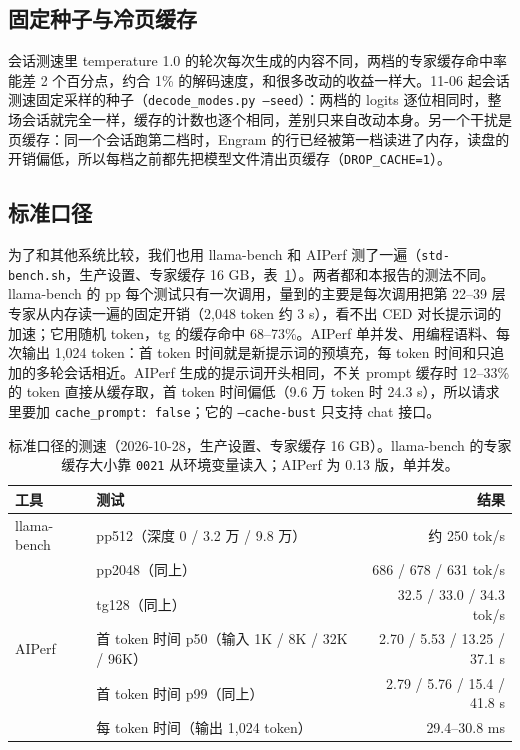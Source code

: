 \documentclass[11pt,a4paper]{article}
\newcommand{\code}[1]{\texttt{#1}}
\newcommand{\tps}{tok/s}
\begin{document}
\subsection{固定种子与冷页缓存}
\label{sec:seeds}

会话测速里 temperature 1.0 的轮次每次生成的内容不同，两档的专家缓存命中率能差 2 个百分点，约合 1\% 的解码速度，和很多改动的收益一样大。11-06 起会话测速固定采样的种子（\code{decode\_modes.py --seed}）：两档的 logits 逐位相同时，整场会话就完全一样，缓存的计数也逐个相同，差别只来自改动本身。另一个干扰是页缓存：同一个会话跑第二档时，Engram 的行已经被第一档读进了内存，读盘的开销偏低，所以每档之前都先把模型文件清出页缓存（\code{DROP\_CACHE=1}）。

\subsection{标准口径}
\label{sec:stdbench}

为了和其他系统比较，我们也用 llama-bench 和 AIPerf 测了一遍（\code{std-bench.sh}，生产设置、专家缓存 16 GB，表~\ref{tab:stdbench}）。两者都和本报告的测法不同。llama-bench 的 pp 每个测试只有一次调用，量到的主要是每次调用把第 22--39 层专家从内存读一遍的固定开销（2,048 token 约 3 s），看不出 CED 对长提示词的加速；它用随机 token，tg 的缓存命中 68--73\%。AIPerf 单并发、用编程语料、每次输出 1,024 token：首 token 时间就是新提示词的预填充，每 token 时间和只追加的多轮会话相近。AIPerf 生成的提示词开头相同，不关 prompt 缓存时 12--33\% 的 token 直接从缓存取，首 token 时间偏低（9.6 万 token 时 24.3 s），所以请求里要加 \code{cache\_prompt: false}；它的 \code{--cache-bust} 只支持 chat 接口。

\begin{table}[h]
  \centering
  \small
  \caption{标准口径的测速（2026-10-28，生产设置、专家缓存 16 GB）。llama-bench 的专家缓存大小靠 \code{0021} 从环境变量读入；AIPerf 为 0.13 版，单并发。}
  \label{tab:stdbench}
  \begin{tabular}{@{}l l r@{}}
    \toprule
    工具 & 测试 & 结果 \\
    \midrule
    llama-bench & pp512（深度 0 / 3.2 万 / 9.8 万） & 约 250 \tps{} \\
     & pp2048（同上） & 686 / 678 / 631 \tps{} \\
     & tg128（同上） & 32.5 / 33.0 / 34.3 \tps{} \\
    AIPerf & 首 token 时间 p50（输入 1K / 8K / 32K / 96K） & 2.70 / 5.53 / 13.25 / 37.1 s \\
     & 首 token 时间 p99（同上） & 2.79 / 5.76 / 15.4 / 41.8 s \\
     & 每 token 时间（输出 1,024 token） & 29.4--30.8 ms \\
    \bottomrule
  \end{tabular}
\end{table}
\end{document}

